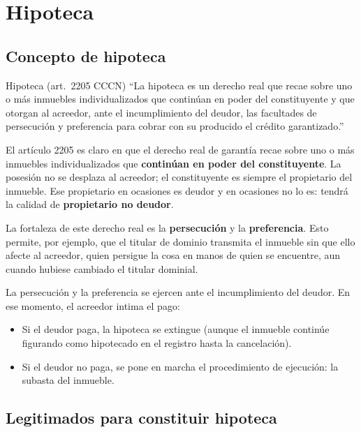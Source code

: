 \documentclass[12pt,oneside]{book}
\begin{document}
\chapter[Hipoteca]{Hipoteca}

\section{Concepto de hipoteca}

\begin{definition}{Hipoteca (art.\ 2205 CCCN)}
``La hipoteca es un derecho real que recae sobre uno o más inmuebles individualizados que continúan en poder del constituyente y que otorgan al acreedor, ante el incumplimiento del deudor, las facultades de persecución y preferencia para cobrar con su producido el crédito garantizado.''
\end{definition}

El artículo 2205 es claro en que el derecho real de garantía recae sobre uno o más inmuebles individualizados que \textbf{continúan en poder del constituyente}. La posesión no se desplaza al acreedor; el constituyente es siempre el propietario del inmueble. Ese propietario en ocasiones es deudor y en ocasiones no lo es: tendrá la calidad de \textbf{propietario no deudor}.

La fortaleza de este derecho real es la \textbf{persecución} y la \textbf{preferencia}. Esto permite, por ejemplo, que el titular de dominio transmita el inmueble sin que ello afecte al acreedor, quien persigue la cosa en manos de quien se encuentre, aun cuando hubiese cambiado el titular dominial.

La persecución y la preferencia se ejercen ante el incumplimiento del deudor. En ese momento, el acreedor intima el pago:

\begin{itemize}
    \item Si el deudor paga, la hipoteca se extingue (aunque el inmueble continúe figurando como hipotecado en el registro hasta la cancelación).
    \item Si el deudor no paga, se pone en marcha el procedimiento de ejecución: la subasta del inmueble.
\end{itemize}

\section{Legitimados para constituir hipoteca}
\end{document}
